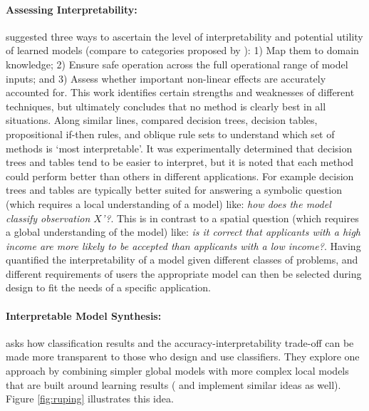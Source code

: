 \paragraph{Assessing Interpretability:}
\citet{Van_Belle2013-ph} suggested three ways to ascertain the level of interpretability and potential utility of learned models (compare to categories proposed by \citet{Lipton2016-ug}): 1) Map them to domain knowledge; 2) Ensure safe operation across the full operational range of model inputs; and 3) Assess whether important non-linear effects are accurately accounted for. This work identifies certain strengths and weaknesses of different techniques, but ultimately concludes that no method is clearly best in all situations. 
%
Along similar lines, \citet{Huysmans2011-th} compared decision trees, decision tables, propositional if-then rules, and oblique rule sets to understand which set of methods is `most interpretable'. It was experimentally determined that decision trees and tables tend to be easier to interpret, but it is noted that each method could perform better than others in different applications. For example decision trees and tables are typically better suited for answering a symbolic question (which requires a local understanding of a model) like: \emph{how does the model classify observation $X$'?}. This is in contrast to a spatial question (which requires a global understanding of the model) like: \emph{is it correct that applicants with a high income are more likely to be accepted than applicants with a low income?}. 
%
Having quantified the interpretability of a model given different classes of problems, and different requirements of users the appropriate model can then be selected during design to fit the needs of a specific application.

\paragraph{Interpretable Model Synthesis:}
\citet{Ruping2006-xj} asks how classification results and the accuracy-interpretability trade-off can be made more transparent to those who design and use classifiers. They explore one approach by combining simpler global models with more complex local models that are built around learning results (\citet{Otte2013-oo} and \citet{Ribeiro2016-uc} implement similar ideas as well). Figure \ref{fig:ruping} illustrates this idea.

